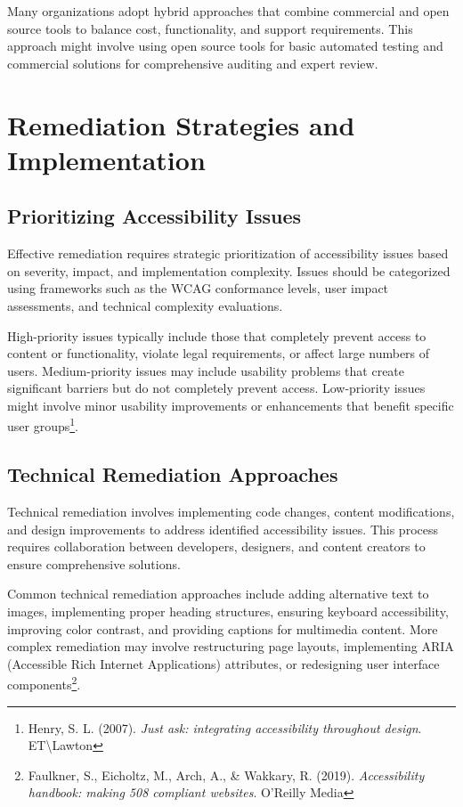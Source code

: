 Many organizations adopt hybrid approaches that combine commercial and open source tools to balance cost, functionality, and support requirements. This approach might involve using open source tools for basic automated testing and commercial solutions for comprehensive auditing and expert review.

\section{Remediation Strategies and Implementation}\label{sec:remediation-implementation}

\subsection{Prioritizing Accessibility Issues}

Effective remediation requires strategic prioritization of accessibility issues based on severity, impact, and implementation complexity. Issues should be categorized using frameworks such as the WCAG conformance levels, user impact assessments, and technical complexity evaluations.

High-priority issues typically include those that completely prevent access to content or functionality, violate legal requirements, or affect large numbers of users. Medium-priority issues may include usability problems that create significant barriers but do not completely prevent access. Low-priority issues might involve minor usability improvements or enhancements that benefit specific user groups\footnote{Henry, S. L. (2007). \textit{Just ask: integrating accessibility throughout design}. ET\textbackslash Lawton}.

\subsection{Technical Remediation Approaches}

Technical remediation involves implementing code changes, content modifications, and design improvements to address identified accessibility issues. This process requires collaboration between developers, designers, and content creators to ensure comprehensive solutions.

Common technical remediation approaches include adding alternative text to images, implementing proper heading structures, ensuring keyboard accessibility, improving color contrast, and providing captions for multimedia content. More complex remediation may involve restructuring page layouts, implementing ARIA (Accessible Rich Internet Applications) attributes, or redesigning user interface components\footnote{Faulkner, S., Eicholtz, M., Arch, A., \& Wakkary, R. (2019). \textit{Accessibility handbook: making 508 compliant websites}. O'Reilly Media}.

